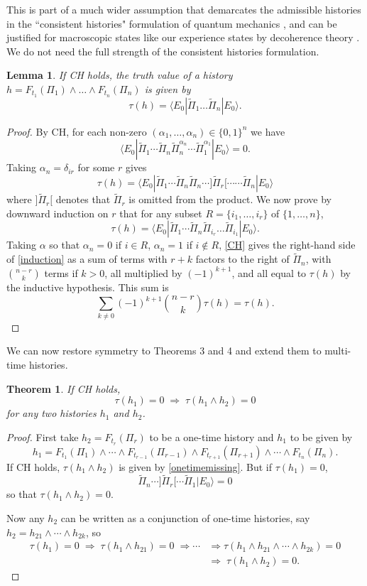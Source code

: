 \documentclass[12pt,a4paper,reqno]{article}
\renewcommand{\(}{\left(}
\renewcommand{\)}{\right)}
\newcommand{\<}{\langle}
\renewcommand{\>}{\rangle}
\newcommand{\impl}{\Longrightarrow}
\newcommand{\be}{\begin{equation}}
\newcommand{\ee}{\end{equation}}
\newcommand{\Pii}{\widetilde{\Pi}}
\theoremstyle{plain} %
\newtheorem{thm}{Theorem}
\newtheorem{lemma}{Lemma}
\begin{document}
This is part of a much wider assumption that demarcates the admissible histories in the ``consistent histories" formulation of quantum mechanics \cite{Griffiths:book}, and can be justified for macroscopic states like our experience states by decoherence theory \cite{Wallace:multiverse}. We do not need the full strength of the consistent histories formulation.

\begin{lemma}\label{PiiPii} If CH holds, the truth value of a history $h = F_{t_1}(\Pi_1)\land\ldots\land F_{t_n}(\Pi_n)$ is given by
\be\label{eqPiiPii}
\tau(h) = \<E_0|\Pii_1\ldots \Pii_n|E_0\>.
\ee
\end{lemma}
\begin{proof} By CH, for each non-zero $(\alpha_1,\ldots , \alpha_n) \in \{0,1\}^n$ we have
\be\label{CH}
\<E_0|\Pii_1\cdots\Pii_n\Pii_n^{\alpha_n}\cdots\Pii_1^{\alpha_1}|E_0\> = 0.
\ee
Taking $\alpha_n = \delta_{ir}$ for some $r$ gives
\be\label{onetimemissing}
\tau(h) = \<E_0|\Pii_1\cdots\Pii_n\Pii_n\cdots ]\Pii_r[\cdots \cdots \Pii_n|E_0\>
\ee
where $]\Pii_r[$ denotes that $\Pii_r$ is omitted from the product. We now prove by downward induction on $r$ that for any subset $R = \{i_1,\ldots ,i_r\}$ of $\{1,\ldots ,n\}$,
\be\label{induction}
\tau(h) = \<E_0|\Pii_1\cdots\Pii_n\Pii_{i_r}\ldots\Pii_{i_1}|E_0\>.
\ee
Taking $\alpha$ so that $\alpha_n = 0$ if $i\in R$, $\alpha_n = 1$ if $i\notin R$, \eqref{CH} gives the right-hand side of \eqref{induction} as a sum of terms with $r+k$ factors to the right of $\Pii_n$, with $\binom{n-r}{k}$ terms if $k>0$, all multiplied by $(-1)^{k+1}$, and all equal to $\tau(h)$ by the inductive hypothesis. This sum is
\[
\sum_{k\neq0}(-1)^{k+1}\binom{n-r}{k}\tau(h) = \tau(h).
\]
 \end{proof}  

We can now restore symmetry to Theorems 3 and 4 and extend them to multi-time histories.

\begin{thm} If CH holds,
\[
\tau(h_1) = 0  \; \impl \; \tau(h_1\land h_2) = 0
\]
for any two histories $h_1$ and $h_2$.
\end{thm}
\begin{proof}
First take $h_2 = F_{t_r}(\Pi_r)$ to be a one-time history and $h_1$ to be given by 
\[
h_1 = F_{t_1}(\Pi_1)\land\cdots\land F_{t_{r-1}}(\Pi_{r-1})\land F_{t_{r+1}}(\Pi_{r+1})\land\cdots \land F_{t_n}(\Pi_n).
\]
If CH holds, $\tau(h_1\land h_2)$ is given by \eqref{onetimemissing}. But if $\tau(h_1) = 0$,
\[
\Pii_n\cdots ]\Pii_r[ \cdots \Pii_1|E_0\> = 0
\]
so that $\tau(h_1\land h_2) = 0$.

Now any $h_2$ can be written as a conjunction of one-time histories, say $h_2 = h_{21}\land\cdots\land h_{2k}$, so
\begin{align*}
\tau(h_1) = 0\; \impl\; \tau(h_1\land h_{21}) = 0\; \impl \cdots &\impl \tau(h_1\land h_{21}\land\cdots\land h_{2k}) = 0\\
 &\impl \; \tau(h_1\land h_2) = 0.
\end{align*}
\end{proof}
\end{document}
